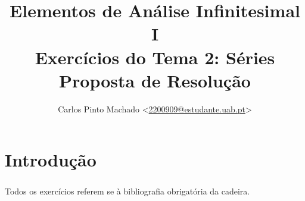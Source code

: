 \documentclass[11pt, a4paper]{report}
\title{
	Elementos de Análise Infinitesimal I\\
	Exercícios do Tema 2: Séries\\
	Proposta de Resolução
}
\author{
	Carlos Pinto Machado
	<\href{mailto:2200909@estudante.uab.pt}{2200909@estudante.uab.pt}>
}
\begin{document}
\maketitle
\tableofcontents

\clearpage

\chapter*{Introdução}
{}

\paragraph{} Todos os exercícios referem se à bibliografia obrigatória da
cadeira\parencite{Santos2016}.





\clearpage

\printbibliography[title={Bibliografia},heading=bibintoc]
\end{document}
